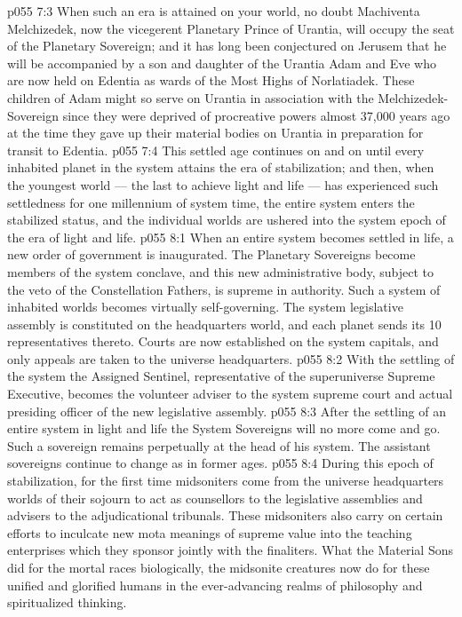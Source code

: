 \vs p055 7:3 When such an era is attained on your world, no doubt Machiventa Melchizedek, now the vicegerent Planetary Prince of Urantia, will occupy the seat of the Planetary Sovereign; and it has long been conjectured on Jerusem that he will be accompanied by a son and daughter of the Urantia Adam and Eve who are now held on Edentia as wards of the Most Highs of Norlatiadek. These children of Adam might so serve on Urantia in association with the Melchizedek\hyp{}Sovereign since they were deprived of procreative powers almost 37,000 years ago at the time they gave up their material bodies on Urantia in preparation for transit to Edentia.
\vs p055 7:4 \pc This settled age continues on and on until every inhabited planet in the system attains the era of stabilization; and then, when the youngest world --- the last to achieve light and life --- has experienced such settledness for one millennium of system time, the entire system enters the stabilized status, and the individual worlds are ushered into the system epoch of the era of light and life.
\vs p055 8:1 When an entire system becomes settled in life, a new order of government is inaugurated. The Planetary Sovereigns become members of the system conclave, and this new administrative body, subject to the veto of the Constellation Fathers, is supreme in authority. Such a system of inhabited worlds becomes virtually self\hyp{}governing. The system legislative assembly is constituted on the headquarters world, and each planet sends its 10 representatives thereto. Courts are now established on the system capitals, and only appeals are taken to the universe headquarters.
\vs p055 8:2 With the settling of the system the Assigned Sentinel, representative of the superuniverse Supreme Executive, becomes the volunteer adviser to the system supreme court and actual presiding officer of the new legislative assembly.
\vs p055 8:3 After the settling of an entire system in light and life the System Sovereigns will no more come and go. Such a sovereign remains perpetually at the head of his system. The assistant sovereigns continue to change as in former ages.
\vs p055 8:4 During this epoch of stabilization, for the first time midsoniters come from the universe headquarters worlds of their sojourn to act as counsellors to the legislative assemblies and advisers to the adjudicational tribunals. These midsoniters also carry on certain efforts to inculcate new mota meanings of supreme value into the teaching enterprises which they sponsor jointly with the finaliters. What the Material Sons did for the mortal races biologically, the midsonite creatures now do for these unified and glorified humans in the ever\hyp{}advancing realms of philosophy and spiritualized thinking.
